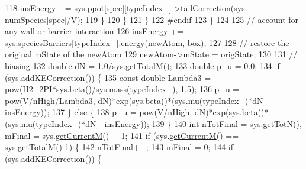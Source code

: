 \begin{DoxyCode}
118                                 insEnergy += sys.\hyperlink{classsim_system_ad2e290b5963f132e6a3a56cee35c8e9f}{ppot}[spec][\hyperlink{classmc_move_acb731965547b0326ef318ec96da8b46a}{typeIndex\_}]->tailCorrection(sys.
      \hyperlink{classsim_system_a9eea865e6dc1cff377b1e79c4d9c23f0}{numSpecies}[spec]/V);
119                         \}
120                     \}
121             \}
122 \textcolor{preprocessor}{#endif}
123 \textcolor{preprocessor}{}        \}
124 
125         \textcolor{comment}{// account for any wall or barrier interaction}
126         insEnergy += sys.\hyperlink{classsim_system_a5ae652ff4519f39c3862abae32a9581b}{speciesBarriers}[\hyperlink{classmc_move_acb731965547b0326ef318ec96da8b46a}{typeIndex\_}].energy(newAtom, box);
127 
128         \textcolor{comment}{// restore the original mState of the newAtom}
129         newAtom->\hyperlink{classatom_a3cb00c0c5b7533657e05af6ff4a42740}{mState} = origState;
130 
131         \textcolor{comment}{// biasing}
132     \textcolor{keywordtype}{double} dN = 1.0/sys.\hyperlink{classsim_system_aa4ad1afff101bb530e1590df05035276}{getTotalM}();
133     \textcolor{keywordtype}{double} p\_u = 0.0;
134     \textcolor{keywordflow}{if} (sys.\hyperlink{classsim_system_a09c4ea670168c9f1d549d2a5120eb13c}{addKECorrection}()) \{
135         \textcolor{keyword}{const} \textcolor{keywordtype}{double} Lambda3 = pow(\hyperlink{global_8h_af42f520b793f7c9dff15cba3bad0eb58}{H2\_2PI}*sys.\hyperlink{classsim_system_a3eeec9678902f8d7fce4dad6064aaf4c}{beta}()/sys.\hyperlink{classsim_system_a7c75052458072e1267bc20594b58d8cd}{mass}(typeIndex\_), 1.5);
136         p\_u = pow(V/nHigh/Lambda3, dN)*exp(sys.\hyperlink{classsim_system_a3eeec9678902f8d7fce4dad6064aaf4c}{beta}()*(sys.\hyperlink{classsim_system_af1e3f5320aff976a448647244d5950d1}{mu}(typeIndex\_)*dN - insEnergy));
137     \} \textcolor{keywordflow}{else} \{
138         p\_u = pow(V/nHigh, dN)*exp(sys.\hyperlink{classsim_system_a3eeec9678902f8d7fce4dad6064aaf4c}{beta}()*(sys.\hyperlink{classsim_system_af1e3f5320aff976a448647244d5950d1}{mu}(typeIndex\_)*dN - insEnergy));
139     \}
140         \textcolor{keywordtype}{int} nTotFinal = sys.\hyperlink{classsim_system_a37dd827f4057049763351510147b9f1d}{getTotN}(), mFinal = sys.\hyperlink{classsim_system_a299fe4372e610b554eaaf5f5957b2dbc}{getCurrentM}() + 1;
141         \textcolor{keywordflow}{if} (sys.\hyperlink{classsim_system_a299fe4372e610b554eaaf5f5957b2dbc}{getCurrentM}() == sys.\hyperlink{classsim_system_aa4ad1afff101bb530e1590df05035276}{getTotalM}()-1) \{
142             nTotFinal++;
143             mFinal = 0;
144             \textcolor{keywordflow}{if} (sys.\hyperlink{classsim_system_a09c4ea670168c9f1d549d2a5120eb13c}{addKECorrection}()) \{

\end{DoxyCode}
